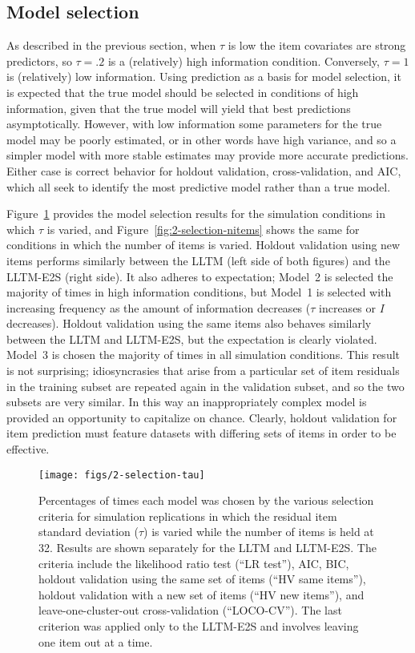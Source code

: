 \subsection{Model selection}

As described in the previous section, when $\tau$ is low the item covariates are strong predictors, so $\tau = .2$ is a (relatively) high information condition. Conversely, $\tau = 1$ is (relatively) low information. 
Using prediction as a basis for model selection, it is expected that the true model should be selected in conditions of high information, given that the true model will yield that best predictions asymptotically.
However, with low information some parameters for the true model may be poorly estimated, or in other words have high variance, and so a simpler model with more stable estimates may provide more accurate predictions.
Either case is correct behavior for holdout validation, cross-validation, and AIC, which all seek to identify the most predictive model rather than a true model.

Figure~\ref{fig:2-selection-tau} provides the model selection results for the simulation conditions in which $\tau$ is varied, and Figure~\ref{fig:2-selection-nitems} shows the same for conditions in which the number of items is varied. Holdout validation using new items performs similarly between the LLTM (left side of both figures) and the LLTM-E2S (right side). It also adheres to expectation; Model~2 is selected the majority of times in high information conditions, but Model~1 is selected with increasing frequency as the amount of information decreases ($\tau$ increases or $I$ decreases). Holdout validation using the same items also behaves similarly between the LLTM and LLTM-E2S, but the expectation is clearly violated. Model~3 is chosen the majority of times in all simulation conditions. This result is not surprising; idiosyncrasies that arise from a particular set of item residuals in the training subset are repeated again in the validation subset, and so the two subsets are very similar. In this way an inappropriately complex model is provided an opportunity to capitalize on chance. Clearly, holdout validation for item prediction must feature datasets with differing sets of items in order to be effective.

\begin{figure}
	\centering
	\texttt{[image: figs/2-selection-tau]}
	\caption{Percentages of times each model was chosen by the various selection criteria for simulation replications in which the residual item standard deviation ($\tau$) is varied while the number of items is held at 32. Results are shown separately for the LLTM and LLTM-E2S. The criteria include the likelihood ratio test (``LR test''), AIC, BIC, holdout validation using the same set of items (``HV same items''), holdout validation with a new set of items (``HV new items''), and leave-one-cluster-out cross-validation (``LOCO-CV''). The last criterion was applied only to the LLTM-E2S and involves leaving one item out at a time.}	
	\label{fig:2-selection-tau}
\end{figure}

